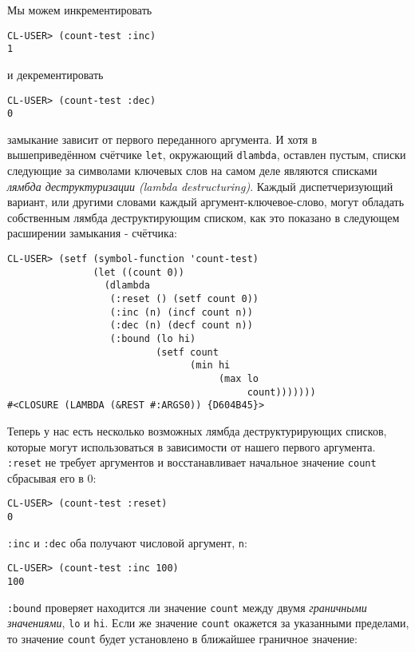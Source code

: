 Мы можем инкрементировать

\begin{verbatim}
CL-USER> (count-test :inc)
1
\end{verbatim}

и декрементировать

\begin{verbatim}
CL-USER> (count-test :dec)
0
\end{verbatim}

замыкание зависит от первого переданного аргумента. И хотя в вышеприведённом счётчике \verb"let", окружающий \verb"dlambda", оставлен пустым, списки следующие за символами ключевых слов на самом деле являются списками \emph{лямбда деструктуризации (lambda destructuring)}. Каждый диспетчеризующий вариант, или другими словами каждый аргумент-ключевое-слово, могут обладать собственным лямбда деструктирующим списком, как это показано в следующем расширении замыкания - счётчика:

\begin{verbatim}
CL-USER> (setf (symbol-function 'count-test)
               (let ((count 0))
                 (dlambda
                  (:reset () (setf count 0))
                  (:inc (n) (incf count n))
                  (:dec (n) (decf count n))
                  (:bound (lo hi)
                          (setf count
                                (min hi
                                     (max lo
                                          count)))))))
#<CLOSURE (LAMBDA (&REST #:ARGS0)) {D604B45}>
\end{verbatim}

Теперь у нас есть несколько возможных лямбда деструктурирующих списков, которые могут использоваться в зависимости от нашего первого аргумента. \verb":reset" не требует аргументов и восстанавливает начальное значение \verb"count" сбрасывая его в 0:

\begin{verbatim}
CL-USER> (count-test :reset)
0
\end{verbatim}

\verb":inc" и \verb":dec" оба получают числовой аргумент, \verb"n":

\begin{verbatim}
CL-USER> (count-test :inc 100)
100
\end{verbatim}

\verb":bound" проверяет находится ли значение \verb"count" между двумя \emph{граничными значениями}, \verb"lo" и \verb"hi". Если же значение \verb"count" окажется за указанными пределами, то значение \verb"count" будет установлено в ближайшее граничное значение:

